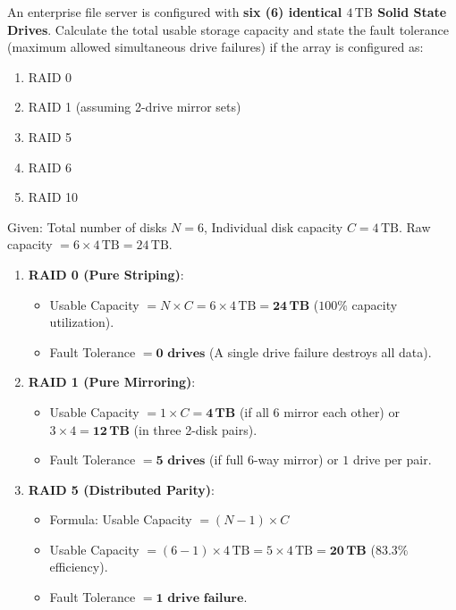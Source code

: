 \begin{example}
An enterprise file server is configured with \textbf{six (6) identical $4\,\text{TB}$ Solid State Drives}. Calculate the total usable storage capacity and state the fault tolerance (maximum allowed simultaneous drive failures) if the array is configured as:
\begin{enumerate}[label=(\alph*)]
    \item RAID 0
    \item RAID 1 (assuming 2-drive mirror sets)
    \item RAID 5
    \item RAID 6
    \item RAID 10
\end{enumerate}

\begin{solutionbox}
Given: Total number of disks $N = 6$, Individual disk capacity $C = 4\,\text{TB}$. Raw capacity $= 6 \times 4\,\text{TB} = 24\,\text{TB}$.

\begin{enumerate}[label=(\alph*)]
    \item \textbf{RAID 0 (Pure Striping)}:
    \begin{itemize}
        \item Usable Capacity $= N \times C = 6 \times 4\,\text{TB} = \mathbf{24\,\text{TB}}$ ($100\%$ capacity utilization).
        \item Fault Tolerance $= \mathbf{0\text{ drives}}$ (A single drive failure destroys all data).
    \end{itemize}
    
    \item \textbf{RAID 1 (Pure Mirroring)}:
    \begin{itemize}
        \item Usable Capacity $= 1 \times C = \mathbf{4\,\text{TB}}$ (if all 6 mirror each other) or $3 \times 4 = \mathbf{12\,\text{TB}}$ (in three 2-disk pairs).
        \item Fault Tolerance $= \mathbf{5\text{ drives}}$ (if full 6-way mirror) or $1$ drive per pair.
    \end{itemize}

    \item \textbf{RAID 5 (Distributed Parity)}:
    \begin{itemize}
        \item Formula: Usable Capacity $= (N - 1) \times C$
        \item Usable Capacity $= (6 - 1) \times 4\,\text{TB} = 5 \times 4\,\text{TB} = \mathbf{20\,\text{TB}}$ ($83.3\%$ efficiency).
        \item Fault Tolerance $= \mathbf{1\text{ drive failure}}$.
    \end{itemize}


\end{enumerate}
\end{solutionbox}
\end{example}
